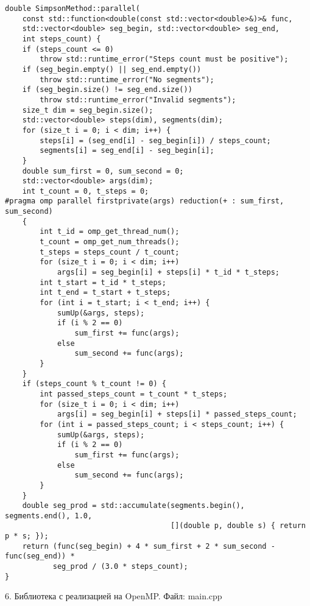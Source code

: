 \documentclass{report}
\begin{document}
\begin{lstlisting}
double SimpsonMethod::parallel(
    const std::function<double(const std::vector<double>&)>& func,
    std::vector<double> seg_begin, std::vector<double> seg_end,
    int steps_count) {
    if (steps_count <= 0)
        throw std::runtime_error("Steps count must be positive");
    if (seg_begin.empty() || seg_end.empty())
        throw std::runtime_error("No segments");
    if (seg_begin.size() != seg_end.size())
        throw std::runtime_error("Invalid segments");
    size_t dim = seg_begin.size();
    std::vector<double> steps(dim), segments(dim);
    for (size_t i = 0; i < dim; i++) {
        steps[i] = (seg_end[i] - seg_begin[i]) / steps_count;
        segments[i] = seg_end[i] - seg_begin[i];
    }
    double sum_first = 0, sum_second = 0;
    std::vector<double> args(dim);
    int t_count = 0, t_steps = 0;
#pragma omp parallel firstprivate(args) reduction(+ : sum_first, sum_second)
    {
        int t_id = omp_get_thread_num();
        t_count = omp_get_num_threads();
        t_steps = steps_count / t_count;
        for (size_t i = 0; i < dim; i++)
            args[i] = seg_begin[i] + steps[i] * t_id * t_steps;
        int t_start = t_id * t_steps;
        int t_end = t_start + t_steps;
        for (int i = t_start; i < t_end; i++) {
            sumUp(&args, steps);
            if (i % 2 == 0)
                sum_first += func(args);
            else
                sum_second += func(args);
        }
    }
    if (steps_count % t_count != 0) {
        int passed_steps_count = t_count * t_steps;
        for (size_t i = 0; i < dim; i++)
            args[i] = seg_begin[i] + steps[i] * passed_steps_count;
        for (int i = passed_steps_count; i < steps_count; i++) {
            sumUp(&args, steps);
            if (i % 2 == 0)
                sum_first += func(args);
            else
                sum_second += func(args);
        }
    }
    double seg_prod = std::accumulate(segments.begin(), segments.end(), 1.0,
                                      [](double p, double s) { return p * s; });
    return (func(seg_begin) + 4 * sum_first + 2 * sum_second - func(seg_end)) *
           seg_prod / (3.0 * steps_count);
}
\end{lstlisting}

\par 6. Библиотека с реализацией на OpenMP. Файл: main.cpp
\end{document}
